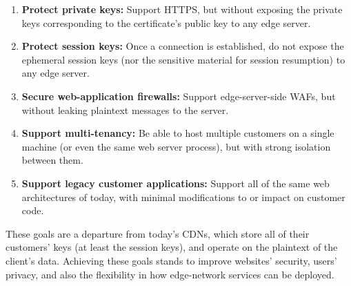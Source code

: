 \vspace*{-0.3\baselineskip}
\begin{enumerate}
\setlength{\itemsep}{0pt}
	\item \textbf{Protect private keys:} Support HTTPS, but without
		exposing the private keys corresponding to the certificate's
		public key to any edge server.
	\item \textbf{Protect session keys:} Once a connection is
		established, do not expose the ephemeral session keys (nor the
		sensitive material for session resumption) to any edge server.
	\item \textbf{Secure web-application firewalls:} Support
		edge-server-side WAFs, but without leaking plaintext messages
		to the server.
	\item \textbf{Support multi-tenancy:} Be able to host
		multiple customers on a single machine (or even the same web
		server process), but with strong isolation between them.
	\item \textbf{Support legacy customer applications:} Support all of
		the same web architectures of today, with minimal modifications
		to or impact on customer code.
\end{enumerate}
\vspace*{-0.3\baselineskip}

These goals are a departure from today's CDNs, which
store all of their customers' keys (at least the session
keys), and operate on the plaintext of the client's data.
%
Achieving these goals stands to improve websites' security, users'
privacy, and also the flexibility in how edge-network services
can be deployed.
